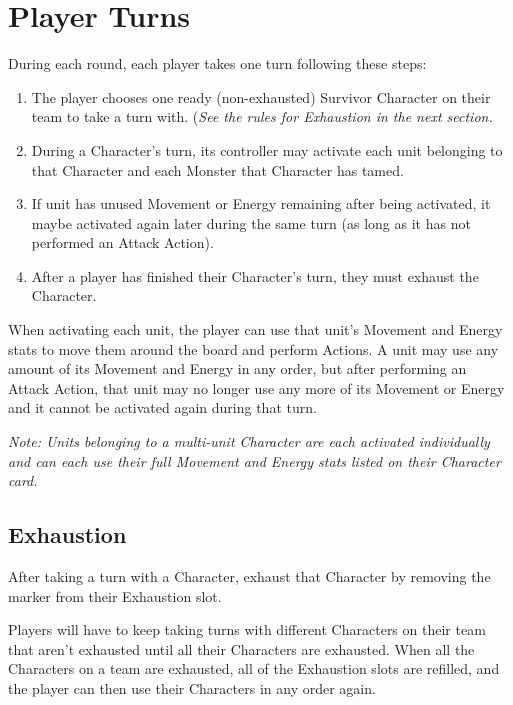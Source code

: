 \documentclass[../main.tex]{subfiles}
\begin{document}
\section{Player Turns}
During each round, each player takes one turn following these steps: 
\begin{enumerate}
    \item The player chooses one ready (non-exhausted) Survivor Character on their team to take a turn with. (\textit{See the rules for Exhaustion in the next section.}
    \item During a Character's turn, its controller may activate each unit belonging to that Character and each Monster that Character has tamed. 
    \item If  unit has unused Movement or Energy remaining after being activated, it maybe activated again later during the same turn (as long as it has not performed an Attack Action). 
    \item After a player has finished their Character's turn, they must exhaust the Character. 
\end{enumerate}

When activating each unit, the player can use that unit's Movement and Energy stats to move them around the board and perform Actions. A unit may use any amount of its Movement and Energy in any order, but after performing an Attack Action, that unit may no longer use any more of its Movement or Energy and it cannot be activated again during that turn. 

\textit{Note: Units belonging to a multi-unit Character are each activated individually and can each use their full Movement and Energy stats listed on their Character card. }

\subsection{Exhaustion}
After taking a turn with a Character, exhaust that Character by removing the marker from their Exhaustion slot. 

Players will have to keep taking turns with different Characters on their team that aren't exhausted until all their Characters are exhausted. When all the Characters on a team are exhausted, all of the Exhaustion slots are refilled, and the player can then use their Characters in any order again. 

\clearpage
\end{document}
